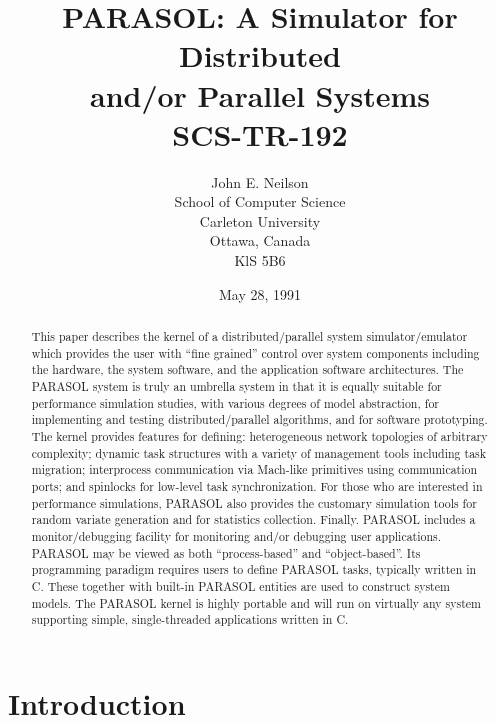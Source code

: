 \documentclass[11pt]{article}
\begin{document}
\title{PARASOL: A Simulator for Distributed\\
and/or Parallel  Systems\\{\small SCS-TR-192}}
\author{John E. Neilson\\
School of Computer Science\\
Carleton University\\
Ottawa, Canada\\
KlS 5B6}
\date{May 28, 1991}
\maketitle

\begin{abstract}
This paper describes the kernel of a distributed/parallel system simulator/emulator
which provides the user with ``fine grained'' control over system components
including the hardware, the system software, and the application software
architectures. The PARASOL system is truly an umbrella system in that it is equally
suitable for performance simulation studies, with various degrees of model
abstraction, for implementing and testing distributed/parallel algorithms, and for
software prototyping. The kernel provides features for defining: heterogeneous
network topologies of arbitrary complexity; dynamic task structures with a variety
of management tools including task migration; interprocess communication via
Mach-like primitives using communication ports; and spinlocks for low-level task
synchronization.  For those who are interested in performance simulations,
PARASOL also provides the customary simulation tools for random variate
generation and for statistics collection.  Finally. PARASOL includes a
monitor/debugging facility for monitoring and/or debugging user applications.
PARASOL may be viewed as both ``process-based'' and ``object-based''.  Its
programming paradigm requires users to define PARASOL tasks, typically written
in C. These together with built-in PARASOL entities are used to construct system
models. The PARASOL kernel is highly portable and will run on virtually any
system supporting simple, single-threaded applications written in C.
\end{abstract}

\section{Introduction}
\label{sec:introduction}
\end{document}
